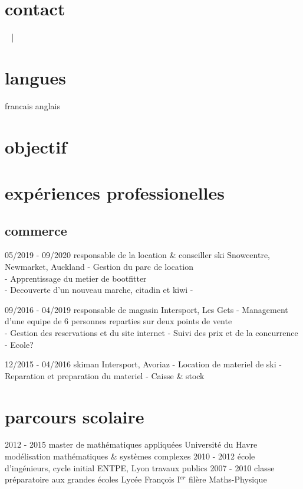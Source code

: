 \documentclass[]{farangoth-cv}
\begin{document}
\makeheader{}

\begin{aside}
  \section{contact}\label{sec:about}
  \myPhoneNumber{}
  ~
  \href{mailto:\myMail{}}{\myMail{}}
  \href{\myGithub}{} | \href{\myLinkedin}{}
  ~
  \myAddress{}

  \section{langues}
  francais
  anglais
\end{aside}

\section{objectif}
\lipsum[2]

\section{expériences professionelles}
\subsection{commerce}
\begin{entrylist}
  \entry%
  {05/2019 \-- 09/2020}
  {responsable de la location \& conseiller ski}
  {Snowcentre, Newmarket, Auckland}
  {
    - Gestion du parc de location\\
    - Apprentissage du metier de bootfitter\\
    - Decouverte d'un nouveau marche, citadin et kiwi
    - 
  }
  
  \entry%
  {09/2016 \-- 04/2019}
  {responsable de magasin}
  {Intersport, Les Gets}
  {
    - Management d'une equipe de 6 personnes reparties sur deux points de vente\\
    - Gestion des reservations  et du site internet
    - Suivi des prix et de la concurrence
    - Ecole?
  }

  \entry%
  {12/2015 \-- 04/2016}
  {skiman}
  {Intersport, Avoriaz}
  {
    - Location de materiel de ski
    - Reparation et preparation du materiel
    - Caisse \& stock
  }
\end{entrylist}

\section{parcours scolaire}
\begin{entrylist}
  \entry%
  {2012 \-- 2015}
  {master de mathématiques appliquées}
  {Université du Havre}
  {
    modélisation mathématiques \& systèmes complexes
  }
  \entry%
  {2010 \-- 2012}
  {école d'ingénieurs, cycle initial}
  {ENTPE, Lyon}
  {
    travaux publics
  }
  \entry%
  {2007 \-- 2010}
  {classe préparatoire aux grandes écoles}
  {Lycée François I$^{er}$}
  {
    filère Maths\--Physique
  }
\end{entrylist}
\end{document}
